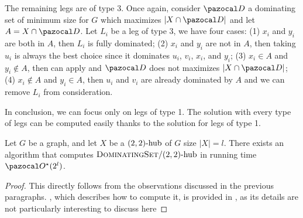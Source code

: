 \medskip

The remaining legs are of type 3. Once again, consider $\D$ a dominating set of minimum size for $G$ which maximizes $|X \cap \D|$ and let $A = X \cap \D$. Let $L_i$ be a leg of type 3, we have four cases: (1) $x_i$ and $y_i$ are both in $A$, then $L_i$ is fully dominated; (2) $x_i$ and $y_i$ are not in $A$, then taking $u_i$ is always the best choice since it dominates $u_i$, $v_i$, $x_i$, and $y_i$; (3) $x_i \in A$ and $y_i \notin A$, then  can apply and $\D$ does not maximizes $|X \cap \D|$; (4) $x_i \notin A$ and $y_i \in A$, then $u_i$ and $v_i$ are already dominated by $A$ and we can remove $L_i$ from consideration.

\medskip

In conclusion, we can focus only on legs of type 1. The solution with every type of legs can be computed easily thanks to the solution for legs of type 1.

\begin{theorem}
    \label{theorem:domset-22-alltypes}
    Let $G$ be a graph, and let $X$ be a $\sdhub[2,2]$ of $G$ size $|X| = l$. There exists an algorithm that computes $\prob{DominatingSet}/\sdhub[2,2]$ in running time $\O^\star(2^l)$.
\end{theorem}

\begin{proof}
    This directly follows from the observations discussed in the previous paragraphs. , which describes how to compute it, is provided in , as its details are not particularly interesting to discuss here
\end{proof}